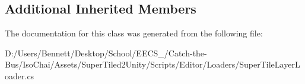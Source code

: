 \subsection*{Additional Inherited Members}


The documentation for this class was generated from the following file\+:\begin{DoxyCompactItemize}
\item 
D\+:/\+Users/\+Bennett/\+Desktop/\+School/\+E\+E\+C\+S\+\_/\+Catch-\/the-\/\+Bus/\+Iso\+Chai/\+Assets/\+Super\+Tiled2\+Unity/\+Scripts/\+Editor/\+Loaders/Super\+Tile\+Layer\+Loader.\+cs\end{DoxyCompactItemize}
